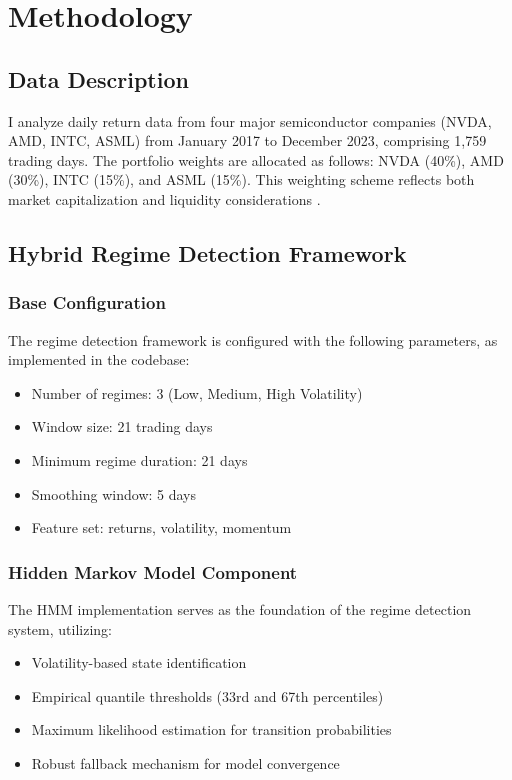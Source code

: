\section{Methodology}

\subsection{Data Description}
I analyze daily return data from four major semiconductor companies (NVDA, AMD, INTC, ASML) from January 2017 to December 2023, comprising 1,759 trading days. The portfolio weights are allocated as follows: NVDA (40\%), AMD (30\%), INTC (15\%), and ASML (15\%). This weighting scheme reflects both market capitalization and liquidity considerations \citep{alexander2008market}.

\subsection{Hybrid Regime Detection Framework}

\subsubsection{Base Configuration}
The regime detection framework \citep{ang2002regime} is configured with the following parameters, as implemented in the codebase:
\begin{itemize}
    \item Number of regimes: 3 (Low, Medium, High Volatility)
    \item Window size: 21 trading days
    \item Minimum regime duration: 21 days
    \item Smoothing window: 5 days
    \item Feature set: returns, volatility, momentum
\end{itemize}

\subsubsection{Hidden Markov Model Component}
The HMM implementation \citep{hamilton1989new} serves as the foundation of the regime detection system, utilizing:
\begin{itemize}
    \item Volatility-based state identification
    \item Empirical quantile thresholds (33rd and 67th percentiles)
    \item Maximum likelihood estimation for transition probabilities
    \item Robust fallback mechanism for model convergence
\end{itemize}

